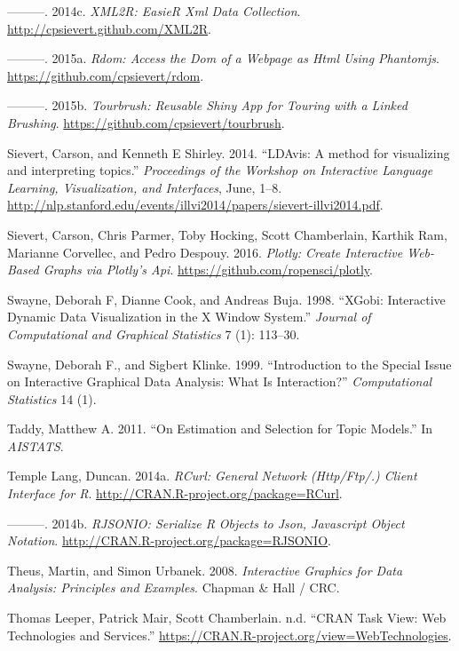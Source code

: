\documentclass[12pt,]{isuthesis}
\begin{document}
\hypertarget{ref-XML2R}{}
---------. 2014c. \emph{XML2R: EasieR Xml Data Collection}.
\url{http://cpsievert.github.com/XML2R}.

\hypertarget{ref-rdom}{}
---------. 2015a. \emph{Rdom: Access the Dom of a Webpage as Html Using
Phantomjs}. \url{https://github.com/cpsievert/rdom}.

\hypertarget{ref-tourbrush}{}
---------. 2015b. \emph{Tourbrush: Reusable Shiny App for Touring with a
Linked Brushing}. \url{https://github.com/cpsievert/tourbrush}.

\hypertarget{ref-Sievert:2014b}{}
Sievert, Carson, and Kenneth E Shirley. 2014. ``LDAvis: A method for
visualizing and interpreting topics.'' \emph{Proceedings of the Workshop
on Interactive Language Learning, Visualization, and Interfaces}, June,
1--8.
\url{http://nlp.stanford.edu/events/illvi2014/papers/sievert-illvi2014.pdf}.

\hypertarget{ref-plotly}{}
Sievert, Carson, Chris Parmer, Toby Hocking, Scott Chamberlain, Karthik
Ram, Marianne Corvellec, and Pedro Despouy. 2016. \emph{Plotly: Create
Interactive Web-Based Graphs via Plotly's Api}.
\url{https://github.com/ropensci/plotly}.

\hypertarget{ref-xgobi}{}
Swayne, Deborah F, Dianne Cook, and Andreas Buja. 1998. ``XGobi:
Interactive Dynamic Data Visualization in the X Window System.''
\emph{Journal of Computational and Graphical Statistics} 7 (1): 113--30.

\hypertarget{ref-swayne-klinke}{}
Swayne, Deborah F., and Sigbert Klinke. 1999. ``Introduction to the
Special Issue on Interactive Graphical Data Analysis: What Is
Interaction?'' \emph{Computational Statistics} 14 (1).

\hypertarget{ref-Taddy}{}
Taddy, Matthew A. 2011. ``On Estimation and Selection for Topic
Models.'' In \emph{AISTATS}.

\hypertarget{ref-RCurl}{}
Temple Lang, Duncan. 2014a. \emph{RCurl: General Network (Http/Ftp/.)
Client Interface for R}. \url{http://CRAN.R-project.org/package=RCurl}.

\hypertarget{ref-RJSONIO}{}
---------. 2014b. \emph{RJSONIO: Serialize R Objects to Json, Javascript
Object Notation}. \url{http://CRAN.R-project.org/package=RJSONIO}.

\hypertarget{ref-mondrianbook}{}
Theus, Martin, and Simon Urbanek. 2008. \emph{Interactive Graphics for
Data Analysis: Principles and Examples}. Chapman \& Hall / CRC.

\hypertarget{ref-WebServices}{}
Thomas Leeper, Patrick Mair, Scott Chamberlain. n.d. ``CRAN Task View:
Web Technologies and Services.''
\url{https://CRAN.R-project.org/view=WebTechnologies}.
\end{document}
